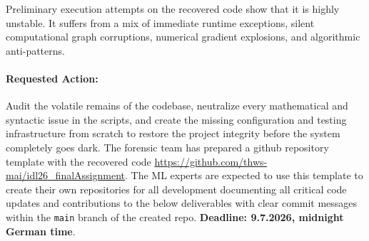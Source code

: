 \documentclass[11pt,a4paper]{article}
\begin{document}
Preliminary execution attempts on the recovered code show that it is highly unstable. It suffers from a mix of immediate runtime exceptions, silent computational graph corruptions, numerical gradient explosions, and algorithmic anti-patterns. 

\vspace{-0.4cm}
\paragraph{Requested Action:} Audit the volatile remains of the codebase, neutralize every mathematical and syntactic issue in the scripts, and create the missing configuration and testing infrastructure from scratch to restore the project integrity before the system completely goes dark. The forensic team has prepared a github repository template with the recovered code \url{https://github.com/thws-mai/idl26_finalAssignment}. The ML experts are expected to use this template to create their own repositories for all development documenting all critical code updates and contributions to the below deliverables with clear commit messages within the \texttt{main} branch of the created repo. \textbf{Deadline: 9.7.2026, midnight German time}. 
\end{document}
